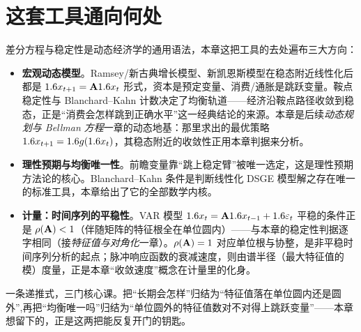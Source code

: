 \section{这套工具通向何处}
\label{sec:difference-6}

差分方程与稳定性是动态经济学的通用语法，本章这把工具的去处遍布三大方向：

\begin{itemize}
    \item \textbf{宏观动态模型}。Ramsey/新古典增长模型、新凯恩斯模型在稳态附近线性化后都是 $1.6 x_{t+1}=\mathbf{A}1.6 x_t$ 形式，资本是预定变量、消费/通胀是跳跃变量。鞍点稳定性与 Blanchard–Kahn 计数决定了均衡轨道——经济沿鞍点路径收敛到稳态，正是``消费会怎样跳到正确水平''这一经典结论的来源。本章是后续\emph{动态规划与 Bellman 方程}一章的动态地基：那里求出的最优策略 $1.6 x_{t+1}=1.6 g(1.6 x_t)$，其稳态附近的收敛性正用本章判据来分析。
    \item \textbf{理性预期与均衡唯一性}。前瞻变量靠``跳上稳定臂''被唯一选定，这是理性预期方法论的核心。Blanchard–Kahn 条件是判断线性化 DSGE 模型解之存在唯一的标准工具，本章给出了它的全部数学内核。
    \item \textbf{计量：时间序列的平稳性}。VAR 模型 $1.6 x_t=\mathbf{A}1.6 x_{t-1}+1.6\varepsilon_t$ 平稳的条件正是 $\rho(\mathbf{A})<1$（伴随矩阵的特征根全在单位圆内）——与本章的稳定性判据逐字相同（接\emph{特征值与对角化}一章）。$\rho(\mathbf{A})=1$ 对应单位根与协整，是非平稳时间序列分析的起点；脉冲响应函数的衰减速度，则由谱半径（最大特征值的模）度量，正是本章``收敛速度''概念在计量里的化身。
\end{itemize}

一条递推式，三门核心课。把``长期会怎样''归结为``特征值落在单位圆内还是圆外'',再把``均衡唯一吗''归结为``单位圆外的特征值数对不对得上跳跃变量''——本章想留下的，正是这两把能反复开门的钥匙。
